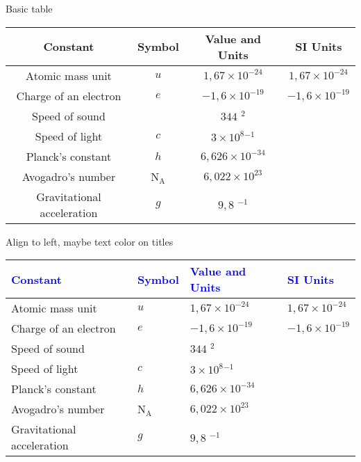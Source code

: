 \documentclass{article}				%
\begin{document}
Basic table

\vspace{0.5cm}		%
\begin{tabular}{|c|c|c|c|} \hline
	\textbf{Constant} 	 	 & Symbol		& \textbf{Value and Units} 					& \textbf{SI Units} \\ \hline		%
	Atomic mass unit 	 	 &  $u$     		& $1,67\times 10^{-24}$ \gram		 		& $1,67\times 10^{-24}$ \kilogram \\ \hline
	Charge of an electron 	 & $e$			& $-1,6\times 10^{-19}$ \coulomb 	 		& $-1,6\times 10^{-19}$ \ampere \cdot \second \\ \hline
	Speed of sound		 	 & 				& $344$ \meter	\cdot \second$^{2}$	 		& \\ \hline	
	Speed of light		 	 & $c$		 	& $3\times 10^{8}$\meter \cdot \second$^{-1}$ & \\ \hline
	Planck's constant	 	 & $h$			& $6,626\times 10^{-34}$\joule \cdot \second    & \\ \hline 
	Avogadro's number	 	 & N$_{\text{A}}$	& $6,022\times 10^{23}$				        & \\ \hline
	Gravitational acceleration	 & $g$			& $9,8$ \meter \cdot \second$^{-1}$			& \\ \hline
\end{tabular}

\vspace{0.5cm}	
Align to left, maybe text color on titles

\vspace{0.5cm}	
\begin{tabular}{| l | l | l | l |} \hline
	\textcolor{blue}{Constant} 	 	 & \textcolor{blue}{Symbol}		& \textcolor{blue}{Value and Units} 					& \textcolor{blue}{SI Units} \\ \hline		
	Atomic mass unit 	 	 &  $u$     		& $1,67\times 10^{-24}$ \gram		 		& $1,67\times 10^{-24}$ \kilogram \\ \hline
	Charge of an electron 	 & $e$			& $-1,6\times 10^{-19}$ \coulomb 	 		& $-1,6\times 10^{-19}$ \ampere \cdot \second \\ \hline
	Speed of sound		 	 & 				& $344$ \meter	\cdot \second$^{2}$	 		& \\ \hline	
	Speed of light		 	 & $c$		 	& $3\times 10^{8}$\meter \cdot \second$^{-1}$ & \\ \hline
	Planck's constant	 	 & $h$			& $6,626\times 10^{-34}$\joule \cdot \second    & \\ \hline 
	Avogadro's number	 	 & N$_{\text{A}}$	& $6,022\times 10^{23}$				        & \\ \hline
	Gravitational acceleration	 & $g$			& $9,8$ \meter \cdot \second$^{-1}$			& \\ \hline
\end{tabular}
\end{document}
